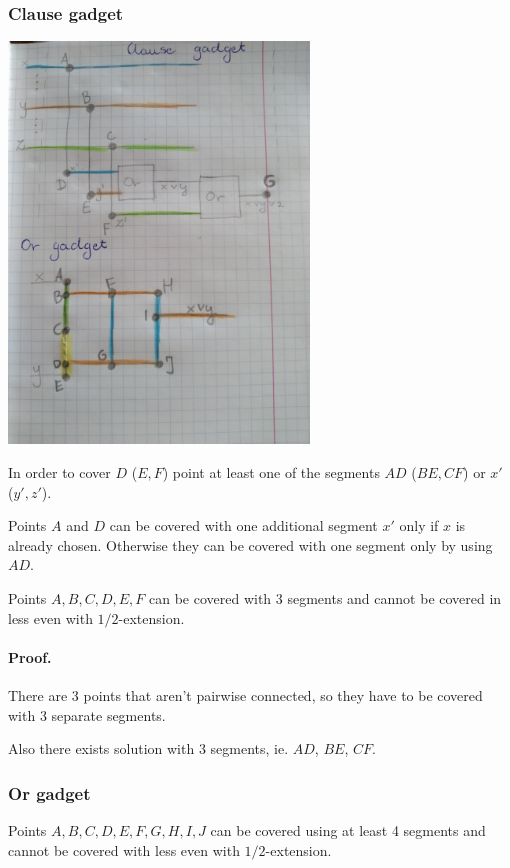 \subsubsection{Clause gadget}
\includegraphics[width=0.6\textwidth]{clause_gadget.jpg}

\begin{lemma}
In order to cover $D$ ($E, F$) point at least one
of the segments $AD$ ($BE, CF$) or $x'$ ($y', z'$).
\end{lemma}

\begin{lemma}
Points $A$ and $D$ can be covered
with one additional segment $x'$
only if $x$ is already chosen.
Otherwise they can be covered with one segment
only by using $AD$.
\end{lemma}

\begin{lemma}
\label{cover_or_gadget_no_less}
Points $A, B, C, D, E, F$ can be covered with 
3 segments and cannot be covered in less even with $1/2$-extension.
\end{lemma}

\paragraph{Proof.}
There are 3 points that aren't pairwise connected,
so they have to be covered with 3 separate segments.

Also there exists solution with 3 segments, ie. $AD$, $BE$, $CF$.

\subsubsection{Or gadget}
\begin{lemma}
\label{cover_clauses_segments_no_less}
Points $A, B, C, D, E, F, G, H, I, J$ can be covered using
at least 4 segments and cannot be covered with less
even with $1/2$-extension.
\end{lemma}


